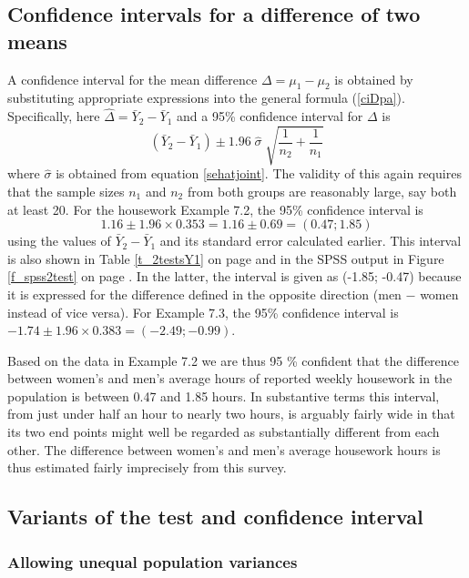 \newpage
\subsection{Confidence intervals for a difference of two means}
\label{ss_means_inference_ci}

A confidence interval for the mean difference $\Delta=\mu_{1}-\mu_{2}$
is obtained by substituting appropriate expressions into the general
formula (\ref{ciDpa}). Specifically, here
$\hat{\Delta}=\bar{Y}_{2}-\bar{Y}_{1}$ and a 95\% confidence interval
for $\Delta$ is
\begin{equation}
(\bar{Y}_{2}-\bar{Y}_{1}) \pm 1.96\;  \hat{\sigma} \;
\sqrt{
\frac{1}{n_{2}}+\frac{1}{n_{1}}
}
\label{ciDmu2}
\end{equation}
where $\hat{\sigma}$ is obtained from equation \ref{sehatjoint}.
The validity of this again requires that the sample sizes $n_{1}$ and $n_{2}$ from both
groups are reasonably large, say both at least 20.
For the housework Example 7.2, the 95\% confidence interval is
\[
1.16\pm 1.96\times 0.353 = 1.16 \pm 0.69 = (0.47; 1.85)
\]
using the values of $\bar{Y}_{2}-\bar{Y}_{1}$ and its standard error
calculated earlier.
This interval is
also shown in Table \ref{t_2testsY1} on page \pageref{t_2testsY1} and in
the SPSS output in Figure \ref{f_spss2test} on page
\pageref{f_spss2test}\label{p_spss2c}.
In the latter, the interval is given as (-1.85; -0.47)
because it is expressed for the difference defined in
the opposite direction (men $-$ women instead of vice versa).
For Example 7.3, the 95\% confidence interval is $-1.74\pm 1.96\times 0.383=(-2.49;
-0.99)$.


Based on the data in Example 7.2 we are thus 95 \% confident that the
difference between women's and men's average hours of reported weekly
housework in the population is between 0.47 and 1.85 hours. In
substantive terms this interval, from just under half an hour to nearly
two hours, is arguably fairly wide in that its two end points might well
be regarded as substantially different from each other. The difference
between women's and men's average housework hours is thus estimated
fairly imprecisely from this survey.


\subsection{Variants of the test and confidence interval}
\label{ss_means_inference_variants}

\subsubsection{Allowing unequal population variances}

